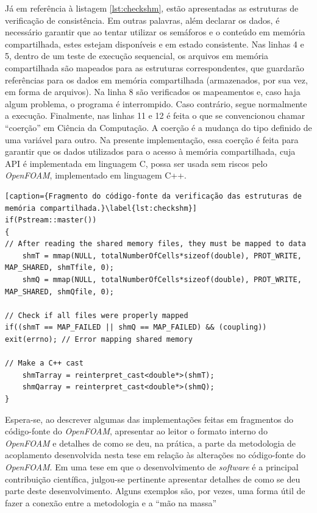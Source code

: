 Já em referência à listagem \ref{lst:checkshm}, estão apresentadas as estruturas de verificação
de consistência. Em outras palavras, além declarar os dados, é necessário garantir que ao tentar utilizar
os semáforos e o conteúdo em memória compartilhada, estes estejam disponíveis e em estado consistente.
Nas linhas 4 e 5, dentro de um teste de execução sequencial, os arquivos em memória compartilhada
são mapeados para as estruturas correspondentes, que guardarão referências para os dados em memória
compartilhada (armazenados, por sua vez, em forma de arquivos). Na linha 8 são verificados os mapeamentos
e, caso haja algum problema, o programa é interrompido. Caso contrário, segue normalmente a execução.
Finalmente, nas linhas 11 e 12 é feita o que se convencionou chamar ``coerção'' em Ciência da Computação.
A coerção é a mudança do tipo definido de uma variável para outro. Na presente implementação, essa coerção
é feita para garantir que os dados utilizados para o acesso à memória compartilhada, cuja API é implementada
em linguagem C, possa ser usada sem riscos pelo \textit{OpenFOAM}, implementado em linguagem C++.

\begin{lstlisting}[caption={Fragmento do código-fonte da verificação das estruturas de memória compartilhada.}\label{lst:checkshm}]
if(Pstream::master())
{
// After reading the shared memory files, they must be mapped to data
    shmT = mmap(NULL, totalNumberOfCells*sizeof(double), PROT_WRITE, MAP_SHARED, shmTfile, 0);
    shmQ = mmap(NULL, totalNumberOfCells*sizeof(double), PROT_WRITE, MAP_SHARED, shmQfile, 0);

// Check if all files were properly mapped
if((shmT == MAP_FAILED || shmQ == MAP_FAILED) && (coupling)) exit(errno); // Error mapping shared memory

// Make a C++ cast
    shmTarray = reinterpret_cast<double*>(shmT);
    shmQarray = reinterpret_cast<double*>(shmQ);
}
\end{lstlisting}




Espera-se, ao descrever algumas das implementações feitas em fragmentos do código-fonte
do \textit{OpenFOAM}, apresentar ao leitor o formato interno do \textit{OpenFOAM}
e detalhes de como se deu, na prática, a parte da metodologia de acoplamento
desenvolvida nesta tese em relação às alterações no código-fonte do \textit{OpenFOAM}.
Em uma tese em que o desenvolvimento de \textit{software} é a principal contribuição científica,
julgou-se pertinente apresentar detalhes de como se deu parte deste desenvolvimento. Alguns exemplos
são, por vezes, uma forma útil de fazer a conexão entre a metodologia e a ``mão na massa''

